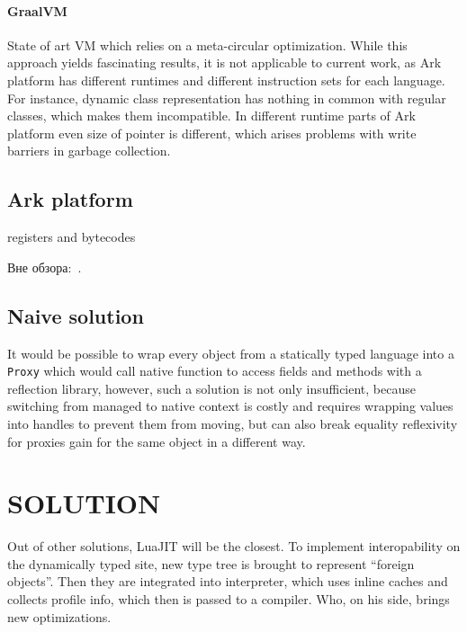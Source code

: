 \documentclass[times, %
               specification,annotation, %
               titlepage-extra-ru,specification-extra-ru,annotation-extra-ru, %
               languages={russian,english} %
              ]{itmo-student-thesis}
\begin{document}
\subsubsection{GraalVM}
State of art VM which relies on a meta-circular optimization. While this approach yields fascinating results, it is not applicable to current work, as Ark platform has different runtimes and different instruction sets for each language. For instance, dynamic class representation has nothing in common with regular classes, which makes them incompatible. In different runtime parts of Ark platform even size of pointer is different, which arises problems with write barriers in garbage collection.

\section{Ark platform}
\TODO
registers and bytecodes

\finishrelatedwork

Вне обзора:~\cite{bellman}.

\section{Naive solution}
It would be possible to wrap every object from a statically typed language into a \texttt{Proxy} which would call native function to access fields and methods with a reflection library, however, such a solution is not only insufficient, because switching from managed to native context is costly and requires wrapping values into handles to prevent them from moving, but can also break equality reflexivity for proxies gain for the same object in a different way.

\chapter{SOLUTION}

Out of other solutions, LuaJIT will be the closest. To implement interopability on the dynamically typed site, new type tree is brought to represent ``foreign objects''. Then they are integrated into interpreter, which uses inline caches and collects profile info, which then is passed to a compiler. Who, on his side, brings new optimizations.
\end{document}

